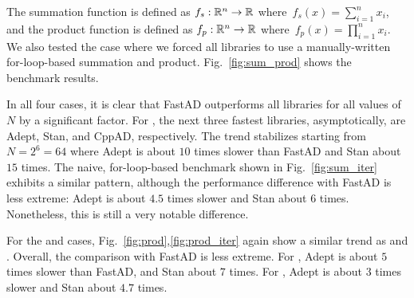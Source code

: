 The summation function is defined as $f_s:\mathbb{R}^n \to \mathbb{R}$ where~$f_s(x) = \sum\limits_{i=1}^n x_i$,
and the product function is defined as $f_p:\mathbb{R}^n \to \mathbb{R}$ where~$f_p(x) = \prod\limits_{i=1}^n x_i$.
We also tested the case where we forced all libraries to use a manually-written for-loop-based summation and product.
Fig.~\ref{fig:sum_prod} shows the benchmark results.

In all four cases, it is clear that FastAD outperforms all libraries for all values of $N$
by a significant factor.
For , 
the next three fastest libraries, asymptotically, are Adept, Stan, and CppAD, respectively.
The trend stabilizes starting from $N=2^6=64$ where Adept is about $ 10$ times slower than
FastAD and Stan about $ 15$ times.
The naive, for-loop-based benchmark shown in Fig.~\ref{fig:sum_iter} exhibits a similar pattern,
although the performance difference with FastAD is less extreme:
Adept is about $ 4.5$ times slower
and Stan about $ 6$ times.
Nonetheless, this is still a very notable difference.

For the  and  cases, 
Fig.~\ref{fig:prod},\ref{fig:prod_iter} again show
a similar trend as  and .
Overall, the comparison with FastAD is less extreme.
For , Adept is about $ 5$ times slower than FastAD,
and Stan about $ 7$ times.
For , Adept is about $3$ times slower
and Stan about $4.7$ times.
